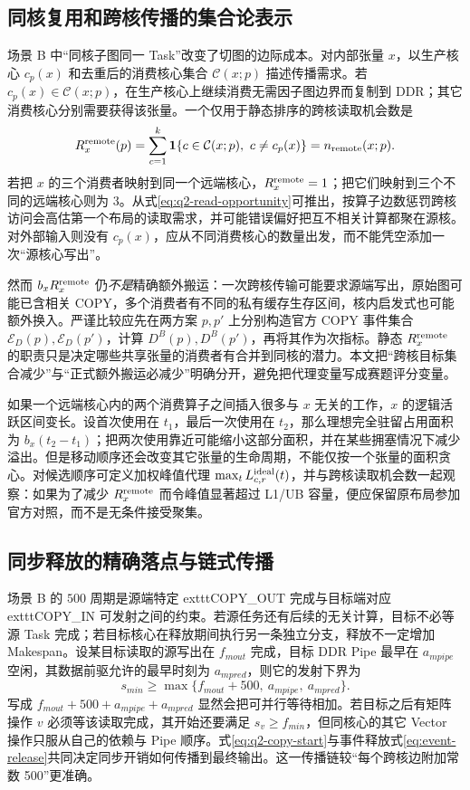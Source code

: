 \subsection{同核复用和跨核传播的集合论表示}
场景 B 中“同核子图同一 Task”改变了切图的边际成本。对内部张量 $x$，以生产核心 $c_p(x)$ 和去重后的消费核心集合 $\mathcal C(x;p)$ 描述传播需求。若 $c_p(x)\in\mathcal C(x;p)$，在生产核心上继续消费无需因子图边界而复制到 DDR；其它消费核心分别需要获得该张量。一个仅用于静态排序的跨核读取机会数是
\begin{equation}\label{eq:q2-read-opportunity}
R_x^{\rm remote}(p)=
\sum_{c=1}^{k}\mathbf 1\{c\in\mathcal C(x;p),\ c\ne c_p(x)\}
=n_{\rm remote}(x;p).
\end{equation}
若把 $x$ 的三个消费者映射到同一个远端核心，$R_x^{\rm remote}=1$；把它们映射到三个不同的远端核心则为 $3$。从式\eqref{eq:q2-read-opportunity}可推出，按算子边数惩罚跨核访问会高估第一个布局的读取需求，并可能错误偏好把互不相关计算都聚在源核。对外部输入则没有 $c_p(x)$，应从不同消费核心的数量出发，而不能凭空添加一次“源核心写出”。

然而 $b_x R_x^{\rm remote}$ 仍\emph{不是}精确额外搬运：一次跨核传输可能要求源端写出，原始图可能已含相关 COPY，多个消费者有不同的私有缓存生存区间，核内启发式也可能额外换入。严谨比较应先在两方案 $p,p'$ 上分别构造官方 COPY 事件集合 $\mathcal E_D(p),\mathcal E_D(p')$，计算 $D^B(p),D^B(p')$，再将其作为次指标。静态 $R_x^{\rm remote}$ 的职责只是决定哪些共享张量的消费者有合并到同核的潜力。本文把“跨核目标集合减少”与“正式额外搬运必减少”明确分开，避免把代理变量写成赛题评分变量。

如果一个远端核心内的两个消费算子之间插入很多与 $x$ 无关的工作，$x$ 的逻辑活跃区间变长。设首次使用在 $t_1$，最后一次使用在 $t_2$，那么理想完全驻留占用面积为 $b_x(t_2-t_1)$；把两次使用靠近可能缩小这部分面积，并在某些拥塞情况下减少溢出。但是移动顺序还会改变其它张量的生命周期，不能仅按一个张量的面积贪心。对候选顺序可定义加权峰值代理 $\max_tL^{\rm ideal}_{c,r}(t)$，并与跨核读取机会数一起观察：如果为了减少 $R_x^{\rm remote}$ 而令峰值显著超过 L1/UB 容量，便应保留原布局参加官方对照，而不是无条件接受聚集。

\subsection{同步释放的精确落点与链式传播}
场景 B 的 $500$ 周期是源端特定 	exttt{COPY\_OUT} 完成与目标端对应 	exttt{COPY\_IN} 可发射之间的约束。若源任务还有后续的无关计算，目标不必等源 Task 完成；若目标核心在释放期间执行另一条独立分支，释放不一定增加 Makespan。设某目标读取的源写出在 $f_{
m out}$ 完成，目标 DDR Pipe 最早在 $a_{
m pipe}$ 空闲，其数据前驱允许的最早时刻为 $a_{
m pred}$，则它的发射下界为
\begin{equation}\label{eq:q2-copy-start}
s_{
m in}\ge\max\{f_{
m out}+500,\ a_{
m pipe},\ a_{
m pred}\}.
\end{equation}
写成 $f_{
m out}+500+a_{
m pipe}+a_{
m pred}$ 显然会把可并行等待相加。若目标之后有矩阵操作 $v$ 必须等该读取完成，其开始还要满足 $s_v\ge f_{
m in}$，但同核心的其它 Vector 操作只服从自己的依赖与 Pipe 顺序。式\eqref{eq:q2-copy-start}与事件释放式\eqref{eq:event-release}共同决定同步开销如何传播到最终输出。这一传播链较“每个跨核边附加常数 500”更准确。

